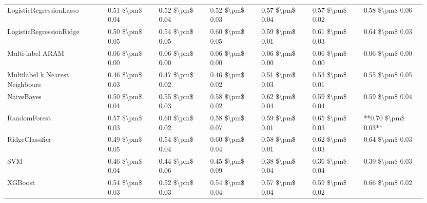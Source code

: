 \begin{tabular}{lllllll}
        LogisticRegressionLasso & 0.51 \$\textbackslash pm\$ 0.04 &           0.52 \$\textbackslash pm\$ 0.04 &       0.52 \$\textbackslash pm\$ 0.03 &        0.57 \$\textbackslash pm\$ 0.04 &                         0.57 \$\textbackslash pm\$ 0.02 &     0.58 \$\textbackslash pm\$ 0.06 \\
        LogisticRegressionRidge & 0.50 \$\textbackslash pm\$ 0.05 &           0.54 \$\textbackslash pm\$ 0.05 &       0.60 \$\textbackslash pm\$ 0.05 &        0.59 \$\textbackslash pm\$ 0.01 &                         0.61 \$\textbackslash pm\$ 0.03 &     0.64 \$\textbackslash pm\$ 0.03 \\
               Multi-label ARAM & 0.06 \$\textbackslash pm\$ 0.00 &           0.06 \$\textbackslash pm\$ 0.00 &       0.06 \$\textbackslash pm\$ 0.00 &        0.06 \$\textbackslash pm\$ 0.00 &                         0.06 \$\textbackslash pm\$ 0.00 &     0.06 \$\textbackslash pm\$ 0.00 \\
Multilabel k Nearest Neighbours & 0.46 \$\textbackslash pm\$ 0.03 &           0.47 \$\textbackslash pm\$ 0.02 &       0.46 \$\textbackslash pm\$ 0.02 &        0.51 \$\textbackslash pm\$ 0.03 &                         0.53 \$\textbackslash pm\$ 0.01 &     0.55 \$\textbackslash pm\$ 0.05 \\
                     NaiveBayes & 0.50 \$\textbackslash pm\$ 0.04 &           0.55 \$\textbackslash pm\$ 0.03 &       0.58 \$\textbackslash pm\$ 0.02 &        0.62 \$\textbackslash pm\$ 0.04 &                         0.59 \$\textbackslash pm\$ 0.04 &     0.59 \$\textbackslash pm\$ 0.04 \\
                   RandomForest & 0.57 \$\textbackslash pm\$ 0.03 &           0.60 \$\textbackslash pm\$ 0.02 &       0.58 \$\textbackslash pm\$ 0.07 &        0.59 \$\textbackslash pm\$ 0.01 &                         0.65 \$\textbackslash pm\$ 0.03 & **0.70 \$\textbackslash pm\$ 0.03** \\
                RidgeClassifier & 0.49 \$\textbackslash pm\$ 0.05 &           0.54 \$\textbackslash pm\$ 0.04 &       0.60 \$\textbackslash pm\$ 0.04 &        0.58 \$\textbackslash pm\$ 0.01 &                         0.62 \$\textbackslash pm\$ 0.03 &     0.64 \$\textbackslash pm\$ 0.03 \\
                            SVM & 0.46 \$\textbackslash pm\$ 0.04 &           0.44 \$\textbackslash pm\$ 0.06 &       0.45 \$\textbackslash pm\$ 0.09 &        0.38 \$\textbackslash pm\$ 0.04 &                         0.36 \$\textbackslash pm\$ 0.04 &     0.39 \$\textbackslash pm\$ 0.03 \\
                        XGBoost & 0.54 \$\textbackslash pm\$ 0.03 &           0.52 \$\textbackslash pm\$ 0.03 &       0.54 \$\textbackslash pm\$ 0.04 &        0.57 \$\textbackslash pm\$ 0.04 &                         0.59 \$\textbackslash pm\$ 0.02 &     0.66 \$\textbackslash pm\$ 0.02 \\
\bottomrule
\end{tabular}
